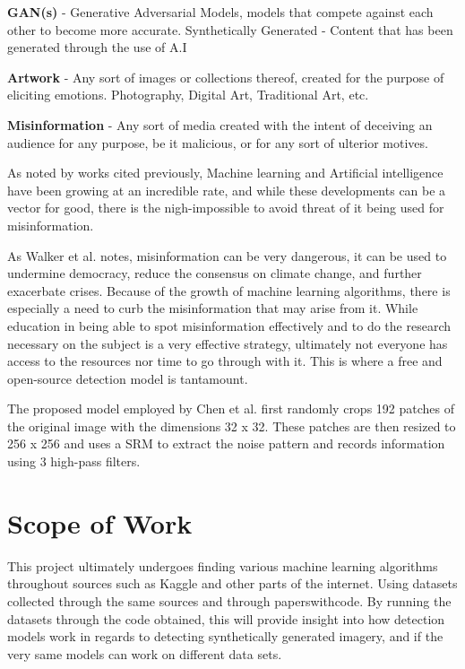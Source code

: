 \documentclass[12pt,letter]{article}
\begin{document}
\textbf{GAN(s)} - Generative Adversarial Models, models that compete against each other to become more accurate.
Synthetically Generated - Content that has been generated through the use of A.I

\textbf{Artwork} - Any sort of images or collections thereof, created for the purpose of eliciting emotions. Photography, Digital Art, Traditional Art, etc.

\textbf{Misinformation} - Any sort of media created with the intent of deceiving an audience for any purpose, be it malicious, or for any sort of ulterior motives.


As noted by works cited previously, Machine learning and Artificial intelligence have been growing at an incredible rate,\cite{brundagem2018} \cite{amorosor2023} and while these developments can be a vector for good, there is the nigh-impossible to avoid threat of it being used for misinformation. \cite{chenj2024} 

As Walker et al. \cite{walkerj2023} notes, misinformation can be very dangerous, it can be used to undermine democracy, reduce the consensus on climate change, and further exacerbate crises. Because of the growth of machine learning algorithms, there is especially a need to curb the misinformation that may arise from it. While education in being able to spot misinformation effectively and to do the research necessary on the subject is a very effective strategy, ultimately not everyone has access to the resources nor time to go through with it. This is where a free and open-source detection model is tantamount. 

The proposed model employed by Chen et al. \cite{chenj2024} first randomly crops 192 patches of the original image with the dimensions 32 x 32. These patches are then resized to 256 x 256 and uses a SRM to extract the noise pattern and records information using 3 high-pass filters.


\section{Scope of Work}

This project ultimately undergoes finding various machine learning algorithms throughout sources such as Kaggle and other parts of the internet. Using datasets collected through the same sources and through paperswithcode. By running the datasets through the code obtained, this will provide insight into how detection models work in regards to detecting synthetically generated imagery, and if the very same models can work on different data sets. 
\end{document}
